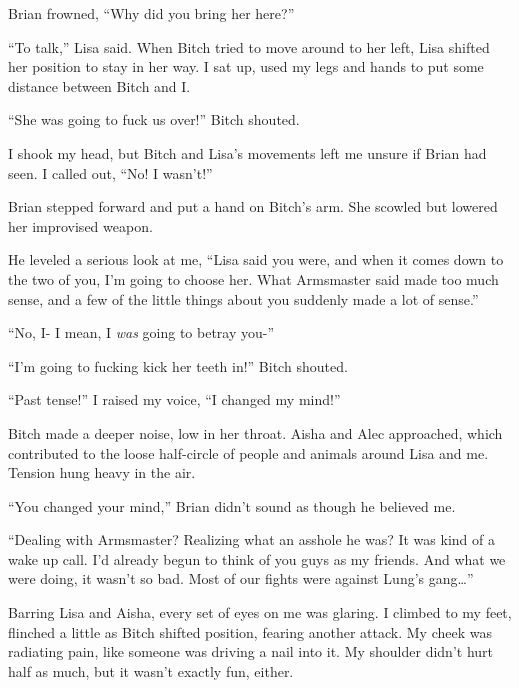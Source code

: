 Brian frowned, ``Why did you bring her here?''



``To talk,'' Lisa said.  When Bitch tried to move around to her left, Lisa shifted her position to stay in her way.  I sat up, used my legs and hands to put some distance between Bitch and I.



``She was going to fuck us over!'' Bitch shouted.



I shook my head, but Bitch and Lisa's movements left me unsure if Brian had seen.  I called out, ``No!  I wasn't!''



Brian stepped forward and put a hand on Bitch's arm.  She scowled but lowered her improvised weapon.



He leveled a serious look at me, ``Lisa said you were, and when it comes down to the two of you, I'm going to choose her.  What Armsmaster said made too much sense, and a few of the little things about you suddenly made a lot of sense.''



``No, I- I mean, I \emph{was }going to betray you-''



``I'm going to fucking kick her teeth in!'' Bitch shouted.



``Past tense!'' I raised my voice, ``I changed my mind!''



Bitch made a deeper noise, low in her throat.  Aisha and Alec approached, which contributed to the loose half-circle of people and animals  around Lisa and me.  Tension hung heavy in the air.



``You changed your mind,'' Brian didn't sound as though he believed me.



``Dealing with Armsmaster?  Realizing what an asshole he was?  It was kind of a wake up call.  I'd already begun to think of you guys as my friends.  And what we were doing, it wasn't so bad.  Most of our fights were against Lung's gang\ldots''



Barring Lisa and Aisha, every set of eyes on me was glaring.  I climbed to my feet, flinched a little as Bitch shifted position, fearing another attack.  My cheek was radiating pain, like someone was driving a nail into it.  My shoulder didn't hurt half as much, but it wasn't exactly fun, either.



